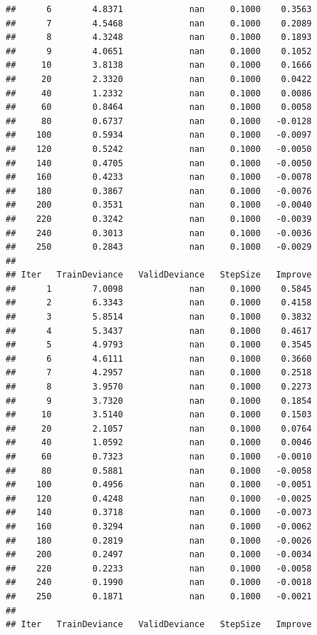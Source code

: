 \documentclass[
]{book}
\begin{document}
\begin{verbatim}
##      6        4.8371             nan     0.1000    0.3563
##      7        4.5468             nan     0.1000    0.2089
##      8        4.3248             nan     0.1000    0.1893
##      9        4.0651             nan     0.1000    0.1052
##     10        3.8138             nan     0.1000    0.1666
##     20        2.3320             nan     0.1000    0.0422
##     40        1.2332             nan     0.1000    0.0086
##     60        0.8464             nan     0.1000    0.0058
##     80        0.6737             nan     0.1000   -0.0128
##    100        0.5934             nan     0.1000   -0.0097
##    120        0.5242             nan     0.1000   -0.0050
##    140        0.4705             nan     0.1000   -0.0050
##    160        0.4233             nan     0.1000   -0.0078
##    180        0.3867             nan     0.1000   -0.0076
##    200        0.3531             nan     0.1000   -0.0040
##    220        0.3242             nan     0.1000   -0.0039
##    240        0.3013             nan     0.1000   -0.0036
##    250        0.2843             nan     0.1000   -0.0029
## 
## Iter   TrainDeviance   ValidDeviance   StepSize   Improve
##      1        7.0098             nan     0.1000    0.5845
##      2        6.3343             nan     0.1000    0.4158
##      3        5.8514             nan     0.1000    0.3832
##      4        5.3437             nan     0.1000    0.4617
##      5        4.9793             nan     0.1000    0.3545
##      6        4.6111             nan     0.1000    0.3660
##      7        4.2957             nan     0.1000    0.2518
##      8        3.9570             nan     0.1000    0.2273
##      9        3.7320             nan     0.1000    0.1854
##     10        3.5140             nan     0.1000    0.1503
##     20        2.1057             nan     0.1000    0.0764
##     40        1.0592             nan     0.1000    0.0046
##     60        0.7323             nan     0.1000   -0.0010
##     80        0.5881             nan     0.1000   -0.0058
##    100        0.4956             nan     0.1000   -0.0051
##    120        0.4248             nan     0.1000   -0.0025
##    140        0.3718             nan     0.1000   -0.0073
##    160        0.3294             nan     0.1000   -0.0062
##    180        0.2819             nan     0.1000   -0.0026
##    200        0.2497             nan     0.1000   -0.0034
##    220        0.2233             nan     0.1000   -0.0058
##    240        0.1990             nan     0.1000   -0.0018
##    250        0.1871             nan     0.1000   -0.0021
## 
## Iter   TrainDeviance   ValidDeviance   StepSize   Improve

\end{verbatim}
\end{document}
